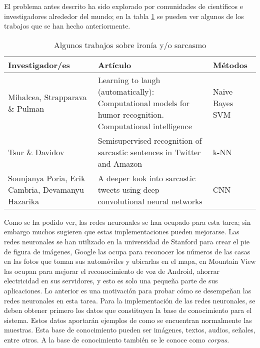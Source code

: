 \par El problema antes descrito ha sido explorado por comunidades de científicos e investigadores alrededor del mundo; en la tabla \ref{table:AlgunosTrabajos} se pueden ver algunos de los trabajos que se han hecho anteriormente.
\begin{table}[h!]
	\centering
	\caption{Algunos trabajos sobre ironía y/o sarcasmo}
	\begin{tabular} {|p{3cm}|p{6cm}|p{2cm}| }
		\hline
		Investigador/es                                   & Artículo                                                                                                   & Métodos         \\[0.5ex]
		\hline
		Mihalcea, Strapparava \& Pulman                   & Learning to laugh (automatically): Computational models for humor recognition.  Computational intelligence & Naive Bayes SVM \\
		\hline
		Tsur \& Davidov                                   & Semisupervised recognition of sarcastic sentences in Twitter and Amazon                                    & k-NN            \\
		\hline
		Sounjanya Poria, Erik Cambria, Devamanyu Hazarika & A deeper look into sarcastic tweets using deep convolutional neural networks                               & CNN             \\[1 ex]
		\hline
	\end{tabular}
	\label{table:AlgunosTrabajos}
\end{table}

\par Como se ha podido ver, las redes neuronales se han ocupado para esta tarea; sin embargo muchos sugieren que estas implementaciones pueden mejorarse. Las redes neuronales se han utilizado en la universidad de Stanford para crear el pie de figura de imágenes, Google las ocupa para reconocer los números de las casas en las fotos que toman sus automóviles y ubicarlas en el mapa, en Mountain View las ocupan para mejorar el reconocimiento de voz de  Android, ahorrar electricidad en sus servidores, y esto es solo una pequeña parte de sus aplicaciones. Lo anterior es una motivación para probar cómo se desempeñan las redes neuronales en esta tarea. Para la implementación de las redes neuronales, se deben obtener primero los datos que constituyen la base de conocimiento para el sistema. Estos datos aportarán ejemplos de como se encuentran normalmente las muestras. Esta base de conocimiento pueden ser imágenes, textos, audios, señales, entre otros. A la base de conocimiento también se le conoce como \textit{corpus}.

